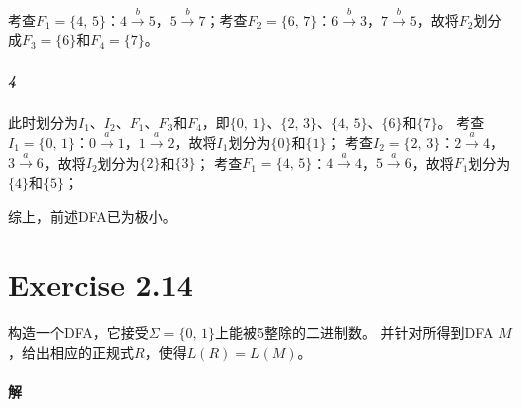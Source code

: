 \documentclass{article}
\begin{document}
考查$F_1=\{4,\,5\}$：$4 \xrightarrow{b} 5$，$5 \xrightarrow{b} 7$；考查$F_2=\{6,\,7\}$：$6 \xrightarrow{b} 3$，$7 \xrightarrow{b} 5$，故将$F_2$划分成$F_3=\{6\}$和$F_4=\{7\}$。
\subparagraph{4}
此时划分为$I_1$、$I_2$、$F_1$、$F_3$和$F_4$，即$\{0,\,1\}$、$\{2,\,3\}$、$\{4,\,5\}$、$\{6\}$和$\{7\}$。
考查$I_1=\{0,\,1\}$：$0 \xrightarrow{a} 1$，$1 \xrightarrow{a} 2$，故将$I_1$划分为$\{0\}$和$\{1\}$；
考查$I_2=\{2,\,3\}$：$2 \xrightarrow{a} 4$，$3 \xrightarrow{a} 6$，故将$I_2$划分为$\{2\}$和$\{3\}$；
考查$F_1=\{4,\,5\}$：$4 \xrightarrow{a} 4$，$5 \xrightarrow{a} 6$，故将$F_1$划分为$\{4\}$和$\{5\}$；\par
综上，前述DFA已为极小。
\\

\section{Exercise 2.14}
构造一个DFA，它接受$\Sigma=\{0,\,1\}$上能被5整除的二进制数。
并针对所得到DFA $M$，给出相应的正规式$R$，使得$L(R) = L(M)$。

\paragraph{解}
\\
\end{document}
